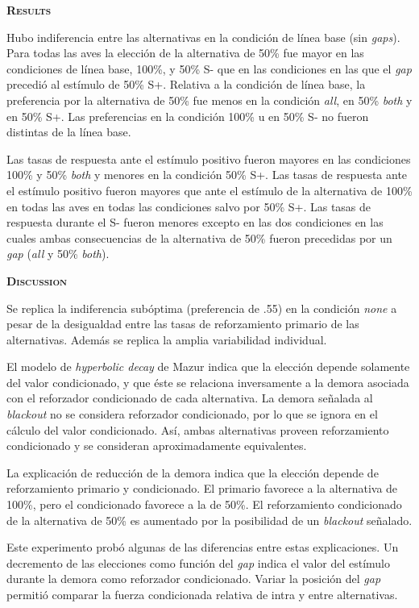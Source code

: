 \documentclass[a4paper,12pt]{article}
\begin{document}
{\scshape\bfseries Results}

Hubo indiferencia entre las alternativas en la condición de línea base (sin {\itshape gaps}). Para todas las aves la elección de la alternativa de 50\% fue mayor en las condiciones de línea base, 100\%, y 50\% S- que en las condiciones en las que el {\itshape gap} precedió al estímulo de 50\% S+. Relativa a la condición de línea base, la preferencia por la alternativa de 50\% fue menos en la condición {\itshape all}, en 50\% {\itshape both} y en 50\% S+. Las preferencias en la condición 100\% u en 50\% S- no fueron distintas de la línea base.

Las tasas de respuesta ante el estímulo positivo fueron mayores en las condiciones 100\% y 50\% {\itshape both} y menores en la condición 50\% S+. Las tasas de respuesta ante el estímulo positivo fueron mayores que ante el estímulo de la alternativa de 100\% en todas las aves en todas las condiciones salvo por 50\% S+. Las tasas de respuesta durante el S- fueron menores excepto en las dos condiciones en las cuales ambas consecuencias de la alternativa de 50\% fueron precedidas por un {\itshape gap} ({\itshape all} y 50\% {\itshape both}).

{\scshape\bfseries Discussion}

Se replica la indiferencia subóptima (preferencia de .55) en la condición {\itshape none} a pesar de la desigualdad entre las tasas de reforzamiento primario de las alternativas. Además se replica la amplia variabilidad individual.

El modelo de {\itshape hyperbolic decay} de Mazur indica que la elección depende solamente del valor condicionado, y que éste se relaciona inversamente a la demora asociada con el reforzador condicionado de cada alternativa. La demora señalada al {\itshape blackout} no se considera reforzador condicionado, por lo que se ignora en el cálculo del valor condicionado. Así, ambas alternativas proveen reforzamiento condicionado y se consideran aproximadamente equivalentes.

La explicación de reducción de la demora indica que la elección depende de reforzamiento primario y condicionado. El primario favorece a la alternativa de 100\%, pero el condicionado favorece a la de 50\%. El reforzamiento condicionado de la alternativa de 50\% es aumentado por la posibilidad de un {\itshape blackout} señalado.

Este experimento probó algunas de las diferencias entre estas explicaciones. Un decremento de las elecciones como función del {\itshape gap} indica el valor del estímulo durante la demora como reforzador condicionado. Variar la posición del {\itshape gap} permitió comparar la fuerza condicionada relativa de intra y entre alternativas.
\end{document}

